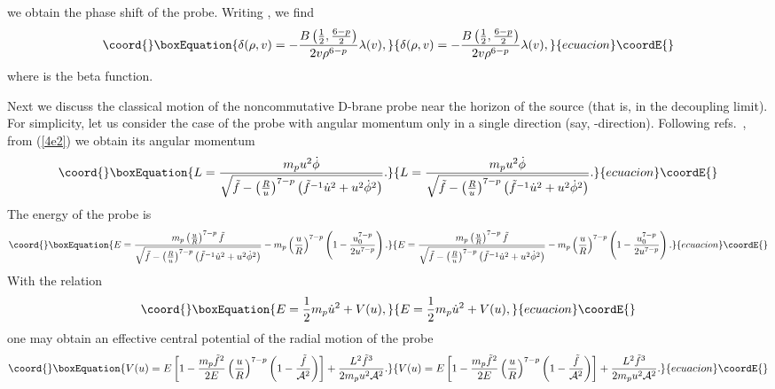 \documentclass[a4paper,12pt]{article}
\begin{document}
we obtain the phase shift of the probe. Writing \coordHE{}, we find
\begin{equation}\coord{}\boxEquation{
\delta (\rho,v) = -\frac{B\left(\frac{1}{2}, \frac{6-p}{2}\right)}
{2v \rho^{6-p}} \lambda (v),
}{
\delta (\rho,v) = -\frac{B\left(\frac{1}{2}, \frac{6-p}{2}\right)}
{2v \rho^{6-p}} \lambda (v),
}{ecuacion}\coordE{}\end{equation}
where \coordHE{} is the beta function.

Next we discuss the classical motion of the noncommutative D\coordHE{}-brane probe
near the horizon of the source (that is, in the decoupling limit). For
simplicity, let us consider the case of the probe with angular momentum
only in a single direction (say, \myHighlight{$\phi$}\coordHE{}-direction). Following
refs.~\cite{Liu,Youm}, from (\ref{4e2}) we
obtain its angular momentum
\begin{equation}\coord{}\boxEquation{
L=\frac{m_p u^2 \dot{\phi}}{
 \sqrt{\tilde{f} -\left(\frac{R}{u}\right)^{7-p}
 \left(\tilde{f}^{-1}\dot{u}^2 +u^2\dot{\phi}^2\right)} }.
}{
L=\frac{m_p u^2 \dot{\phi}}{
 \sqrt{\tilde{f} -\left(\frac{R}{u}\right)^{7-p}
 \left(\tilde{f}^{-1}\dot{u}^2 +u^2\dot{\phi}^2\right)} }.
}{ecuacion}\coordE{}\end{equation}
The energy of the probe is
\begin{equation}\coord{}\boxEquation{
E = \frac{m_p\left(\frac{u}{R}\right)^{7-p}\tilde{f}}{
 \sqrt{\tilde{f} -\left(\frac{R}{u}\right)^{7-p}
 \left(\tilde{f}^{-1}\dot{u}^2 +u^2\dot{\phi}^2\right)}}
 -m_p\left(\frac{u}{R}\right)^{7-p}\left (1
 -\frac{u_0^{7-p}}{2u^{7-p}} \right ).
}{
E = \frac{m_p\left(\frac{u}{R}\right)^{7-p}\tilde{f}}{
 \sqrt{\tilde{f} -\left(\frac{R}{u}\right)^{7-p}
 \left(\tilde{f}^{-1}\dot{u}^2 +u^2\dot{\phi}^2\right)}}
 -m_p\left(\frac{u}{R}\right)^{7-p}\left (1
 -\frac{u_0^{7-p}}{2u^{7-p}} \right ).
}{ecuacion}\coordE{}\end{equation}
With the relation
\begin{equation}\coord{}\boxEquation{
E= \frac{1}{2}m_p \dot{u}^2 + V(u),
}{
E= \frac{1}{2}m_p \dot{u}^2 + V(u),
}{ecuacion}\coordE{}\end{equation}
one may obtain an effective central potential of the radial motion of the
probe
\begin{equation}\coord{}\boxEquation{
\label{4e14}
V(u)=E\left[1 -\frac{m_p \tilde{f}^2}{2E}\left(\frac{u}{R}\right)^{7-p}
 \left (1-\frac{\tilde{f}}{{\cal A}^2}\right)\right]
 +\frac{L^2 \tilde{f}^3}{2m_p u^2 {\cal A}^2}.
}{
V(u)=E\left[1 -\frac{m_p \tilde{f}^2}{2E}\left(\frac{u}{R}\right)^{7-p}
 \left (1-\frac{\tilde{f}}{{\cal A}^2}\right)\right]
 +\frac{L^2 \tilde{f}^3}{2m_p u^2 {\cal A}^2}.
}{ecuacion}\coordE{}\end{equation}
\end{document}
